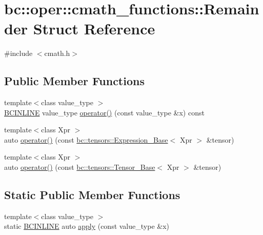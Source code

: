 \hypertarget{structbc_1_1oper_1_1cmath__functions_1_1Remainder}{}\section{bc\+:\+:oper\+:\+:cmath\+\_\+functions\+:\+:Remainder Struct Reference}
\label{structbc_1_1oper_1_1cmath__functions_1_1Remainder}


{\ttfamily \#include $<$cmath.\+h$>$}

\subsection*{Public Member Functions}
\begin{DoxyCompactItemize}
\item 
{\footnotesize template$<$class value\+\_\+type $>$ }\\\hyperlink{common_8h_a6699e8b0449da5c0fafb878e59c1d4b1}{B\+C\+I\+N\+L\+I\+NE} value\+\_\+type \hyperlink{structbc_1_1oper_1_1cmath__functions_1_1Remainder_a6e3226f6e49bc27fe45dfe6337a80294}{operator()} (const value\+\_\+type \&x) const
\item 
{\footnotesize template$<$class Xpr $>$ }\\auto \hyperlink{structbc_1_1oper_1_1cmath__functions_1_1Remainder_af444454bd3404384caefd62cae8b8958}{operator()} (const \hyperlink{classbc_1_1tensors_1_1Expression__Base}{bc\+::tensors\+::\+Expression\+\_\+\+Base}$<$ Xpr $>$ \&tensor)
\item 
{\footnotesize template$<$class Xpr $>$ }\\auto \hyperlink{structbc_1_1oper_1_1cmath__functions_1_1Remainder_ad8a5466416fe6e37ee19c39a1ee9322c}{operator()} (const \hyperlink{classbc_1_1tensors_1_1Tensor__Base}{bc\+::tensors\+::\+Tensor\+\_\+\+Base}$<$ Xpr $>$ \&tensor)
\end{DoxyCompactItemize}
\subsection*{Static Public Member Functions}
\begin{DoxyCompactItemize}
\item 
{\footnotesize template$<$class value\+\_\+type $>$ }\\static \hyperlink{common_8h_a6699e8b0449da5c0fafb878e59c1d4b1}{B\+C\+I\+N\+L\+I\+NE} auto \hyperlink{structbc_1_1oper_1_1cmath__functions_1_1Remainder_afa27d675b03c4f81342b34fe91cd5d11}{apply} (const value\+\_\+type \&x)
\end{DoxyCompactItemize}


